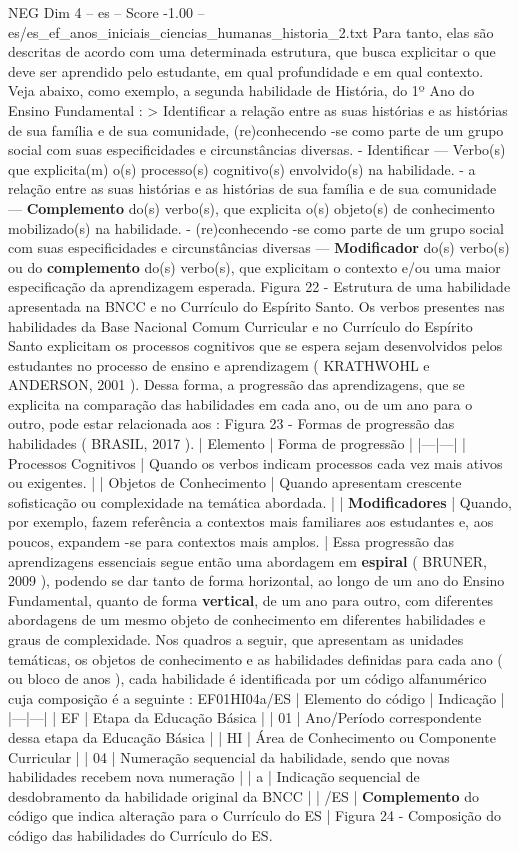 \begin{textsample}{NEG Dim 4 – es – Score -1.00 – es/es\_ef\_anos\_iniciais\_ciencias\_humanas\_historia\_2.txt}
Para tanto, elas são descritas de acordo com uma determinada estrutura, que busca explicitar o que deve ser aprendido pelo estudante, em qual profundidade e em qual contexto.
Veja abaixo, como exemplo, a segunda habilidade de História, do 1º Ano do Ensino Fundamental : > Identificar a relação entre as suas histórias e as histórias de sua família e de sua comunidade, (re)conhecendo -se como parte de um grupo social com suas especificidades e circunstâncias diversas. - Identificar — Verbo(s) que explicita(m) o(s) processo(s) cognitivo(s) envolvido(s) na habilidade. - a relação entre as suas histórias e as histórias de sua família e de sua comunidade — \textbf{Complemento} do(s) verbo(s), que explicita o(s) objeto(s) de conhecimento mobilizado(s) na habilidade. - (re)conhecendo -se como parte de um grupo social com suas especificidades e circunstâncias diversas — \textbf{Modificador} do(s) verbo(s) ou do \textbf{complemento} do(s) verbo(s), que explicitam o contexto e/ou uma maior especificação da aprendizagem esperada.
Figura 22 - Estrutura de uma habilidade apresentada na BNCC e no Currículo do Espírito Santo.
Os verbos presentes nas habilidades da Base Nacional Comum Curricular e no Currículo do Espírito Santo explicitam os processos cognitivos que se espera sejam desenvolvidos pelos estudantes no processo de ensino e aprendizagem ( KRATHWOHL e ANDERSON, 2001 ).
Dessa forma, a progressão das aprendizagens, que se explicita na comparação das habilidades em cada ano, ou de um ano para o outro, pode estar relacionada aos : Figura 23 - Formas de progressão das habilidades ( BRASIL, 2017 ). | Elemento | Forma de progressão | |---|---| | Processos Cognitivos | Quando os verbos indicam processos cada vez mais ativos ou exigentes. | | Objetos de Conhecimento | Quando apresentam crescente sofisticação ou complexidade na temática abordada. | | \textbf{Modificadores} | Quando, por exemplo, fazem referência a contextos mais familiares aos estudantes e, aos poucos, expandem -se para contextos mais amplos. | Essa progressão das aprendizagens essenciais segue então uma abordagem em \textbf{espiral} ( BRUNER, 2009 ), podendo se dar tanto de forma horizontal, ao longo de um ano do Ensino Fundamental, quanto de forma \textbf{vertical}, de um ano para outro, com diferentes abordagens de um mesmo objeto de conhecimento em diferentes habilidades e graus de complexidade.
Nos quadros a seguir, que apresentam as unidades temáticas, os objetos de conhecimento e as habilidades definidas para cada ano ( ou bloco de anos ), cada habilidade é identificada por um código alfanumérico cuja composição é a seguinte : EF01HI04a/ES | Elemento do código | Indicação | |---|---| | EF | Etapa da Educação Básica | | 01 | Ano/Período correspondente dessa etapa da Educação Básica | | HI | Área de Conhecimento ou Componente Curricular | | 04 | Numeração sequencial da habilidade, sendo que novas habilidades recebem nova numeração | | a | Indicação sequencial de desdobramento da habilidade original da BNCC | | /ES | \textbf{Complemento} do código que indica alteração para o Currículo do ES | Figura 24 - Composição do código das habilidades do Currículo do ES.

\end{textsample}
